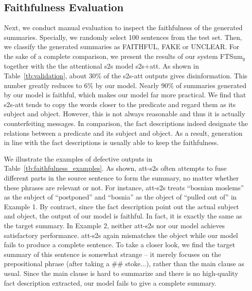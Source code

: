 \documentclass[letterpaper]{article} %
\begin{document}
	\subsection{Faithfulness Evaluation}
	Next, we conduct manual evaluation to inspect the faithfulness of the generated summaries.
	Specially, we randomly select 100 sentences from the test set.
	Then, we classify the generated summaries as FAITHFUL, FAKE or UNCLEAR.
	For the sake of a complete comparison, we present the results of our system FTSum$_g$ together with the the attentional s2s model s2s+att.
	As shown in Table~\ref{tb:validation}, about 30\% of the s2s-att outputs gives disinformation.
	This number greatly reduces to 6\% by our model.
	Nearly 90\% of summaries generated by our model is faithful, which makes our model far more practical.
	We find that s2s-att tends to copy the words closer to the predicate and regard them as its subject and object.
	However, this is not always reasonable and thus it is actually counterfeiting messages. 
	In comparison, the fact descriptions indeed designate the relations between a predicate and its subject and object.
	As a result, generation in line with the fact descriptions is usually able to keep the faithfulness.
	
	We illustrate the examples of defective outputs in Table~\ref{tb:faithfulness_examples}.
	As shown, att-s2s often attempts to fuse different parts in the source sentence to form the summary, no matter whether these phrases are relevant or not.
	For instance, att-s2s treats ``bosnian moslems'' as the subject of ``postponed'' and ``bosnia'' as the object of ``pulled out of'' in Example 1.
	By contract, since the fact description point out the actual subject and object, the output of our model is faithful.
	In fact, it is exactly the same as the target summary. 
	In Example 2, neither att-s2s nor our model achieves satisfactory performance.
	att-s2s again mismatches the object while our model fails to produce a complete sentence.
	To take a closer look, we find the target summary of this sentence is somewhat strange -- it merely focuses on the prepositional phrase (after taking a \#\# stoke...), rather than the main clause as usual.
	Since the main clause is hard to summarize and there is no high-quality fact description extracted, our model fails to give a complete summary.
	
\end{document}
